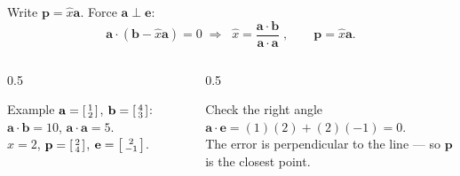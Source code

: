 \documentclass[aspectratio=169, 11pt]{beamer}
\newcommand{\bb}{\mathbf{b}}
\newcommand{\pp}{\mathbf{p}}
\newcommand{\ee}{\mathbf{e}}
\newcommand{\avec}{\mathbf{a}}
\begin{document}
\begin{frame}[t, plain]
  Write $\pp=\hat{x}\avec$. Force $\avec\perp\ee$:
  \[
    \avec\cdot(\bb-\hat{x}\avec)=0 \;\Longrightarrow\;
    \boxed{\;\hat{x}=\frac{\avec\cdot\bb}{\avec\cdot\avec}\;},\qquad \pp=\hat{x}\avec.
  \]
  \begin{columns}[T]
    \begin{column}{0.5\textwidth}
      \begin{block}{Example}
        $\avec=\begin{bsmallmatrix} 1\\2 \end{bsmallmatrix}$, $\bb=\begin{bsmallmatrix} 4\\3 \end{bsmallmatrix}$:
        $\avec\cdot\bb=10$, $\avec\cdot\avec=5$.\\[3pt]
        $\hat{x}=2$, \; $\pp=\begin{bsmallmatrix} 2\\4 \end{bsmallmatrix}$, \; $\ee=\begin{bsmallmatrix} 2\\-1 \end{bsmallmatrix}$.
      \end{block}
    \end{column}
    \begin{column}{0.5\textwidth}
      \begin{block}{Check the right angle}
        $\avec\cdot\ee=(1)(2)+(2)(-1)=0.$ \checkmark\\[3pt]
        The error is perpendicular to the line --- so $\pp$ is the closest point.
      \end{block}
    \end{column}
  \end{columns}
\end{frame}
\end{document}
